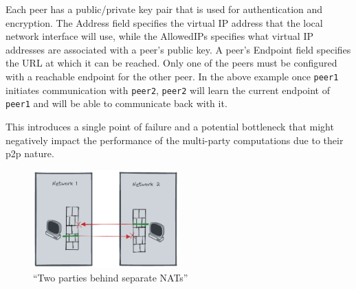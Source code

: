 \begin{Shaded}
\begin{Highlighting}[]
\KeywordTok{[}\KeywordTok{]}
 \OperatorTok{=} \ErrorTok{/}
 \OperatorTok{=} 
 \OperatorTok{=} \ErrorTok{/}\ErrorTok{+}\OperatorTok{=}

\KeywordTok{[}\KeywordTok{]}
 \OperatorTok{=} \ErrorTok{/}\ErrorTok{+}\OperatorTok{=}
 \OperatorTok{=} \ErrorTok{/}
\end{Highlighting}
\end{Shaded}

Each peer has a public/private key pair that is used for authentication
and encryption. The Address field specifies the virtual IP address that
the local network interface will use, while the AllowedIPs specifies
what virtual IP addresses are associated with a peer's public key. A
peer's Endpoint field specifies the URL at which it can be reached. Only
one of the peers must be configured with a reachable endpoint for the
other peer. In the above example once \texttt{peer1} initiates
communication with \texttt{peer2}, \texttt{peer2} will learn the current
endpoint of \texttt{peer1} and will be able to communicate back with it.

This introduces a single point of failure and a potential bottleneck
that might negatively impact the performance of the multi-party
computations due to their \gls{p2p} nature.

\begin{figure}
\centering
\includegraphics[width=0.5\textwidth,height=0.25\textheight]{thesis/../figures/nat-intro.png}
\caption{``Two parties behind separate NATs''\label{nat-intro}}
\end{figure}

